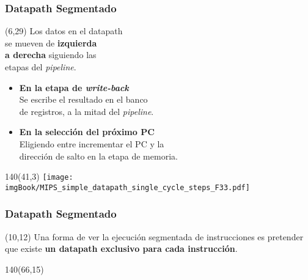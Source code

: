 \documentclass[aspectratio=169]{beamer}
\begin{document}
\begin{frame}[t,fragile]
    \frametitle{Datapath Segmentado}
    \begin{textblock}{70}(6,29)
    \small
    Los datos en el datapath\\
    se mueven de \textbf{izquierda\\
    a derecha} siguiendo las\\
    etapas del \emph{pipeline}.\\
    \bigskip
    \begin{itemize}
     \item<2-> \textcolor{naranjauca}{\textbf{En la etapa de \emph{write-back}}}\\
     Se escribe el resultado en el banco\\
     de registros, a la mitad del \emph{pipeline}.
     \item<3-> \textcolor{naranjauca}{\textbf{En la selección del próximo PC}}\\
     Eligiendo entre incrementar el PC y la\\
     dirección de salto en la etapa de memoria.
    \end{itemize}
    \end{textblock}
    \begin{textblock}{140}(41,3)
    \texttt{[image: imgBook/MIPS\_simple\_datapath\_single\_cycle\_steps\_F33.pdf]}
    \end{textblock}
\end{frame}

\begin{frame}[t,fragile]
    \frametitle{Datapath Segmentado}
    \begin{textblock}{50}(10,12)
    \small
    Una forma de ver la ejecución segmentada de instrucciones es pretender que existe \textbf{un datapath exclusivo para cada instrucción}.\\
    \bigskip
    \bigskip
    \end{textblock}
    \begin{textblock}{140}(66,15)
    \end{textblock}
\end{frame}
\end{document}
